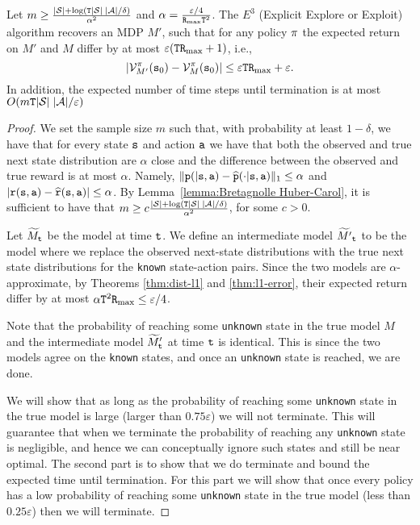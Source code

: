 \begin{theorem}
\label{thm:MBRL:EEE}
Let $m\geq
\frac{|\mathcal{S}|+\log({\tt T}|\mathcal{S}|\;|\mathcal{A}|/\delta)}{\alpha^2}$
and $\alpha=\frac{\varepsilon/4}{{\tt R}_{\max } {\tt T}^2}$.
%
The $E^3$ (Explicit Explore or Exploit) algorithm recovers an MDP
$M'$, such that for any policy $\pi$ the expected return on $M'$
and $M$ differ by at most $\varepsilon({\tt T}{\tt R}_{\max }+1)$, i.e.,
$$|\mathcal{V}^\pi_{M'}({\tt s}_0)-\mathcal{V}^\pi_M({\tt s}_0) |\leq
\varepsilon{\tt T}{\tt R}_{\max }+\varepsilon. $$
 In addition, the expected number of time
steps until termination is at most $O(m{\tt T}
|\mathcal{S}|\;|\mathcal{A}|/\varepsilon)$
\end{theorem}

\begin{proof}
We set the sample size $m$ such that, with probability at least $1-\delta$, we
have that for every state ${\tt s}$ and action ${\tt a}$ we have that
both the observed and true next state distribution are $\alpha$
close and the difference between the observed and true reward is at
most $\alpha$. Namely,
$\|{\tt p}(|{\tt s},{\tt a})-\widehat{{\tt p}}(\cdot|{\tt s},{\tt a})\|_1\leq
\alpha$ and
$|{\tt r}({\tt s},{\tt a})-\widehat{{\tt r}}({\tt s},{\tt a})|\leq
\alpha$.
By Lemma~\ref{lemma:Bretagnolle Huber-Carol}, it is sufficient to have that $m\geq
c\frac{|\mathcal{S}|+\log({\tt T}|\mathcal{S}|\;|\mathcal{A}|/\delta)}{\alpha^2}$, for some $c>0$.

Let $\widetilde{M}_{\tt t}$ be the model at time ${\tt t}$. We define an intermediate model
$\widetilde{M'}_{\tt t}$ to be the model where we replace the observed
next-state distributions with the true next state distributions for the \texttt{known} state-action pairs.
Since the two models are $\alpha$-approximate, by Theorems \ref{thm:dist-l1} and \ref{thm:l1-error}, their expected return
differ by at most $\alpha{\tt T}^2{\tt R}_{\max }\leq \varepsilon/4$.

Note that the probability of reaching some \texttt{unknown} state in the true model $M$ and the intermediate model
$\widetilde{M}'_{\tt t}$ at time ${\tt t}$ is identical. This is since the
two models agree on the \texttt{known} states, and once an \texttt{unknown} state is
reached, we are done.

We will show that as long as the probability of reaching some \texttt{unknown} state in the true model is large (larger than $0.75\varepsilon$) we will not terminate. This will guarantee that when we terminate the probability of reaching any \texttt{unknown} state is negligible, and hence we can conceptually ignore such states and still be near optimal. The second part is to show that we do terminate and bound the expected time until termination. For this part we will show that once every policy has a low probability of reaching some \texttt{unknown} state in the true model  (less than $0.25\varepsilon$) then we will terminate. 


\end{proof}

